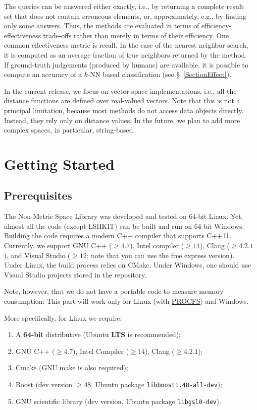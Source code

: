 \documentclass[runningheads,a4paper]{llncs}
\newcommand{\ttt}[1]{\texttt{#1}}
\newcommand{\knn}{$k$-NN }
\begin{document}
{The queries can be answered either exactly, 
i.e., by returning a complete result set that does not contain erroneous elements, or, 
approximately, e.g., by finding only some answers.
Thus, the methods are evaluated in terms of efficiency-effectiveness trade-offs
rather than merely in terms of their efficiency.
One common effectiveness metric is recall. In the case
of the nearest neighbor search, it is computed as
an average fraction of true neighbors returned by the method.
If ground-truth judgements (produced by humans) are available,
it is possible to compute an accuracy of a \knn based classification
(see \S~\ref{SectionEffect}).

In the current release, we focus on vector-space implementations,
i.e., all the distance functions are defined over real-valued vectors. 
Note that this is not a principal limitation, 
because most methods do not access data objects
directly. 
Instead, they rely only on distance values.
In the future, we plan to add more complex spaces, in particular, string-based.

\section{Getting Started}
\subsection{Prerequisites}
The Non-Metric Space Library was developed and tested on 64-bit Linux.
Yet, almost all the code (except LSHKIT) can be built and run on 64-bit Windows.
Building the code requires a modern C++ compiler that supports \mbox{C++11}.
Currently, we support GNU C++ ($\ge4.7$), Intel compiler ($\ge14$), 
Clang ($\ge4.2.1$), 
and Visual Studio ($\ge12$; note that you can use the free express version).
Under Linux, the build process relies on CMake. 
Under Windows, one should use Visual Studio projects stored in the repository.

Note, however, that we do not have a portable code to measure memory consumption:
This part will work only for Linux (with \href{https://en.wikipedia.org/wiki/Procfs}{PROCFS})
and Windows. 

More specifically, for Linux we require:
\begin{enumerate}
\item A \textbf{64-bit} distributive (Ubuntu \textbf{LTS} is recommended);
\item GNU C++ ($\ge4.7$), Intel Compiler ($\ge14$), Clang ($\ge4.2.1$);
\item Cmake (GNU make is also required);
\item Boost (dev version $\ge48$, Ubuntu package \ttt{libboost1.48-all-dev});
\item GNU scientific library (dev version, Ubuntu package \ttt{libgsl0-dev}).
\end{enumerate}

}
\end{document}
